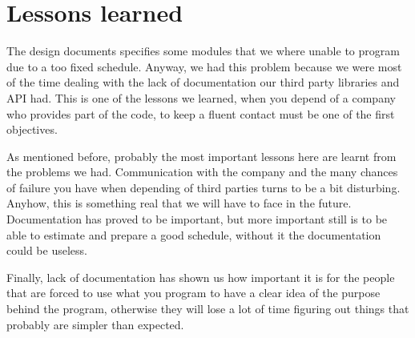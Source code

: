 \documentclass[12pt,a4paper]{article}
\begin{document}
\section{Lessons learned}

The design documents specifies some modules that we where unable to
program due to a too fixed schedule. Anyway, we had this problem
because we were most of the time dealing with the lack of
documentation our third party libraries and API had. This is one of
the lessons we learned, when you depend of a company who provides part
of the code, to keep a fluent contact must be one of the first
objectives.

As mentioned before, probably the most important lessons here are
learnt from the problems we had. Communication with the company and
the many chances of failure you have when depending of third parties
turns to be a bit disturbing. Anyhow, this is something real that we
will have to face in the future. Documentation has proved to be
important, but more important still is to be able to estimate and
prepare a good schedule, without it the documentation could be
useless. 

Finally, lack of documentation has shown us how important it is for
the people that are forced to use what you program to have a clear
idea of the purpose behind the program, otherwise they will lose a lot
of time figuring out things that probably are simpler than expected.
\end{document}
